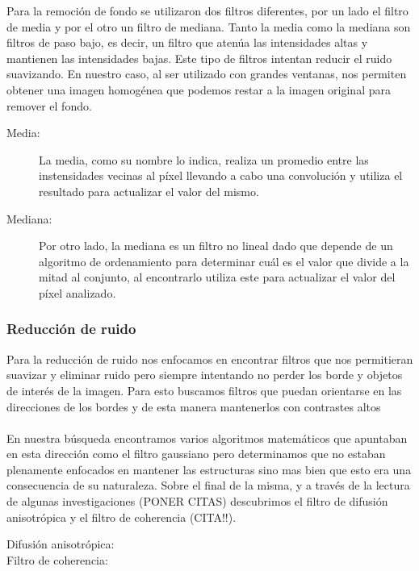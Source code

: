 Para la remoci\'on de fondo se utilizaron dos filtros diferentes, por un lado el filtro de media y por el otro un filtro de mediana. Tanto la media como la mediana son filtros de paso bajo, es decir, un filtro que aten\'ua las intensidades altas y mantienen las intensidades bajas. Este tipo de filtros intentan reducir el ruido suavizando. En nuestro caso, al ser utilizado con grandes ventanas, nos permiten obtener una imagen homogénea que podemos restar a la imagen original para remover el fondo.

\begin{description}
  \item[Media:] La media, como su nombre lo indica, realiza un promedio entre las instensidades vecinas al p\'ixel llevando a cabo una convoluci\'on y utiliza el resultado para actualizar el valor del mismo.
  \item[Mediana:] Por otro lado, la mediana es un filtro no lineal dado que depende de un algoritmo de ordenamiento para determinar cu\'al es el valor que divide a la mitad al conjunto, al encontrarlo utiliza este para actualizar el valor del p\'ixel analizado.
\end{description}

\subsubsection{Reducci\'on de ruido}

Para la reducci\'on de ruido nos enfocamos en encontrar filtros que nos permitieran suavizar y eliminar ruido pero siempre intentando no perder los borde y objetos de inter\'es de la imagen. Para esto buscamos filtros que puedan orientarse en las direcciones de los bordes y de esta manera mantenerlos con contrastes altos\\
\\En nuestra b\'usqueda encontramos varios algoritmos matem\'aticos que apuntaban en esta direcci\'on como el filtro gaussiano pero determinamos que no estaban plenamente enfocados en mantener las estructuras sino mas bien que esto era una consecuencia de su naturaleza. Sobre el final de la misma, y a trav\'es de la lectura de algunas investigaciones (PONER CITAS) descubrimos el filtro de difusi\'on anisotr\'opica \cite{perona1990scale} y el filtro de coherencia (CITA!!).

\begin{description}
  \item[Difusi\'on anisotr\'opica:]
  \item[Filtro de coherencia:]
\end{description}


